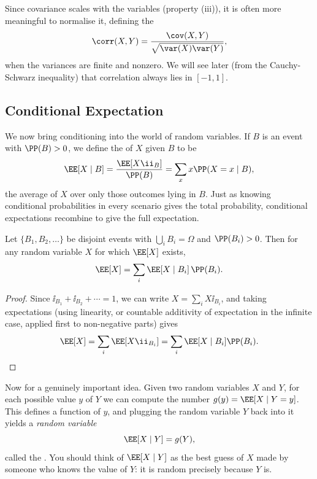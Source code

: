 Since covariance scales with the variables (property (iii)), it is often more meaningful to normalise it, defining the 
$$
\corr(X, Y) = \frac{\cov(X, Y)}{\sqrt{\var(X)\var(Y)}},
$$
when the variances are finite and nonzero. We will see later (from the Cauchy-Schwarz inequality) that correlation always lies in $[-1, 1]$.

\subsection{Conditional Expectation}

We now bring conditioning into the world of random variables. If $B$ is an event with $\PP(B) > 0$, we define the  of $X$ given $B$ to be
$$
\EE[X \mid B] = \frac{\EE[X \ii_B]}{\PP(B)} = \sum_x x \PP(X = x \mid B),
$$
the average of $X$ over only those outcomes lying in $B$. Just as knowing conditional probabilities in every scenario gives the total probability, conditional expectations recombine to give the full expectation.

\begin{theorem}
	Let $\{B_1, B_2, \dots\}$ be disjoint events with $\bigcup_i B_i = \Omega$ and $\PP(B_i) > 0$. Then for any random variable $X$ for which $\EE[X]$ exists,
	$$
	\EE[X] = \sum_i \EE[X \mid B_i] \, \PP(B_i).
	$$
\end{theorem}
\begin{proof}
	Since $\ii_{B_1} + \ii_{B_2} + \cdots = 1$, we can write $X = \sum_i X\ii_{B_i}$, and taking expectations (using linearity, or countable additivity of expectation in the infinite case, applied first to non-negative parts) gives
	$$
	\EE[X] = \sum_i \EE[X \ii_{B_i}] = \sum_i \EE[X \mid B_i]\PP(B_i). \qedhere
	$$
\end{proof}

Now for a genuinely important idea. Given two random variables $X$ and $Y$, for each possible value $y$ of $Y$ we can compute the number $g(y) = \EE[X \mid Y = y]$. This defines a function of $y$, and plugging the random variable $Y$ back into it yields a \emph{random variable}
$$
\EE[X \mid Y] = g(Y),
$$
called the . You should think of $\EE[X \mid Y]$ as the best guess of $X$ made by someone who knows the value of $Y$: it is random precisely because $Y$ is.

